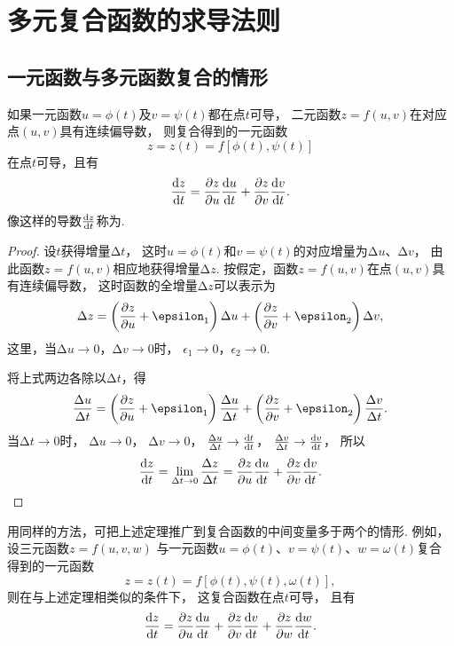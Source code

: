 \section{多元复合函数的求导法则}
\subsection{一元函数与多元函数复合的情形}
\begin{theorem}
如果一元函数\(u=\phi(t)\)及\(v=\psi(t)\)都在点\(t\)可导，
二元函数\(z=f(u,v)\)在对应点\((u,v)\)具有连续偏导数，
则复合得到的一元函数\[
	z = z(t) = f[\phi(t),\psi(t)]
\]
在点\(t\)可导，且有\[
	\dv{z}{t} = \pdv{z}{u}\dv{u}{t} + \pdv{z}{v}\dv{v}{t}.
\]
像这样的导数\(\dv{z}{t}\)称为.
\begin{proof}
\def\D#1#2{\frac{\increment #1}{\increment #2}}
设\(t\)获得增量\(\increment t\)，
这时\(u=\phi(t)\)和\(v=\psi(t)\)的对应增量为\(\increment u\)、\(\increment v\)，
由此函数\(z=f(u,v)\)相应地获得增量\(\increment z\).
按假定，函数\(z=f(u,v)\)在点\((u,v)\)具有连续偏导数，
这时函数的全增量\(\increment z\)可以表示为
\[
	\increment z
	= \left(\pdv{z}{u} + \epsilon_1\right) \increment u
	+ \left(\pdv{z}{v} + \epsilon_2\right) \increment v,
\]
这里，当\(\increment u\to0\)，\(\increment v\to0\)时，
\(\epsilon_1\to0\)，\(\epsilon_2\to0\).

将上式两边各除以\(\increment t\)，得\[
	\D{u}{t}
	= \left(\pdv{z}{u} + \epsilon_1\right) \D{u}{t}
	+ \left(\pdv{z}{v} + \epsilon_2\right) \D{v}{t}.
\]
当\(\increment t\to0\)时，
\(\increment u\to0\)，
\(\increment v\to0\)，
\(\D{u}{t} \to \dv{t}{t}\)，
\(\D{v}{t} \to \dv{v}{t}\)，
所以\[
	\dv{z}{t} = \lim_{\increment t\to0}{\D{z}{t}}
	= \pdv{z}{u} \dv{u}{t} + \pdv{z}{v} \dv{v}{t}.
	\qedhere
\]
\end{proof}
\end{theorem}
用同样的方法，可把上述定理推广到复合函数的中间变量多于两个的情形.
例如，设三元函数\(z=f(u,v,w)\)
与一元函数\(u=\phi(t)\)、\(v=\psi(t)\)、\(w=\omega(t)\)复合得到的一元函数\[
	z = z(t) = f[\phi(t),\psi(t),\omega(t)],
\]
则在与上述定理相类似的条件下，
这复合函数在点\(t\)可导，
且有\[
	\dv{z}{t} = \pdv{z}{u}\dv{u}{t} + \pdv{z}{v}\dv{v}{t} + \pdv{z}{w}\dv{w}{t}.
\]

